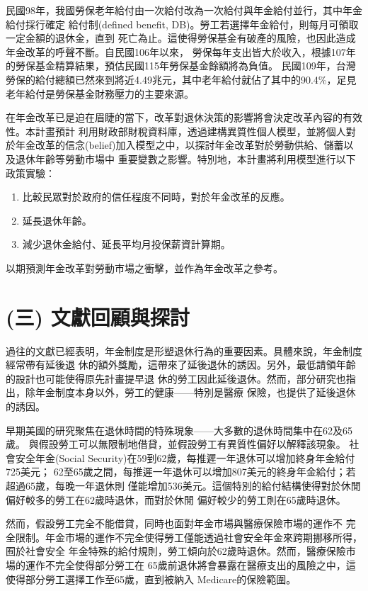 \documentclass[12pt]{article}
\begin{document}
\begin{CJK*}{UTF8}{bkai}
民國98年，我國勞保老年給付由一次給付改為一次給付與年金給付並行，其中年金給付採行確定
給付制(defined benefit, DB)。勞工若選擇年金給付，則每月可領取一定金額的退休金，直到
死亡為止。這使得勞保基金有破產的風險，也因此造成年金改革的呼聲不斷。自民國106年以來，
勞保每年支出皆大於收入，根據107年的勞保基金精算結果，預估民國115年勞保基金餘額將為負值。
民國109年，台灣勞保的給付總額已然來到將近4.49兆元，其中老年給付就佔了其中的90.4\%，足見
老年給付是勞保基金財務壓力的主要來源。

在年金改革已是迫在眉睫的當下，改革對退休決策的影響將會決定改革內容的有效性。本計畫預計
利用財政部財稅資料庫，透過建構異質性個人模型，並將個人對
於年金改革的信念(belief)加入模型之中，以探討年金改革對於勞動供給、儲蓄以及退休年齡等勞動市場中
重要變數之影響。特別地，本計畫將利用模型進行以下政策實驗：
\begin{enumerate}
    \item 比較民眾對於政府的信任程度不同時，對於年金改革的反應。
    \item 延長退休年齡。
    \item 減少退休金給付、延長平均月投保薪資計算期。
\end{enumerate}
以期預測年金改革對勞動市場之衝擊，並作為年金改革之參考。

\section*{\normalfont(三) 文獻回顧與探討}

過往的文獻已經表明，年金制度是形塑退休行為的重要因素。具體來說，年金制度經常帶有延後退
休的額外獎勵，這帶來了延後退休的誘因。另外，最低請領年齡的設計也可能使得原先計畫提早退
休的勞工因此延後退休。然而，部分研究也指出，除年金制度本身以外，勞工的健康——特別是醫療
保險，也提供了延後退休的誘因。

早期美國的研究聚焦在退休時間的特殊現象——大多數的退休時間集中在62及65歲。\cite{burtless1986}
與\cite{gustman1986}假設勞工可以無限制地借貸，並假設勞工有異質性偏好以解釋該現象。
社會安全年金(Social Security)在59到62歲，每推遲一年退休可以增加終身年金給付725美元；
62至65歲之間，每推遲一年退休可以增加807美元的終身年金給付；若超過65歲，每晚一年退休則
僅能增加536美元。這個特別的給付結構使得對於休閒偏好較多的勞工在62歲時退休，而對於休閒
偏好較少的勞工則在65歲時退休。

然而，\cite{rust1997}假設勞工完全不能借貸，同時也面對年金市場與醫療保險市場的運作不
完全限制。年金市場的運作不完全使得勞工僅能透過社會安全年金來跨期挪移所得，囿於社會安全
年金特殊的給付規則，勞工傾向於62歲時退休。然而，醫療保險市場的運作不完全使得部分勞工在
65歲前退休將會暴露在醫療支出的風險之中，這使得部分勞工選擇工作至65歲，直到被納入
Medicare的保險範圍。


\end{CJK*}
\end{document}
